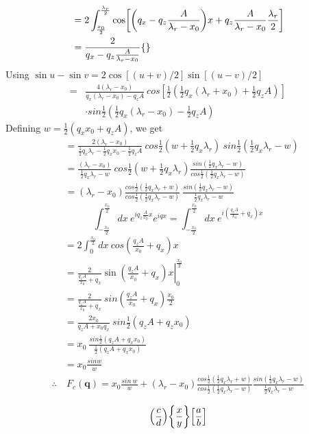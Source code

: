 \documentclass[letterpage]{article}
\begin{document}
\begin{align}
  &= 2\int_{\frac{x_0}{2}}^{\frac{\lambda_r}{2}}   
     \cos\mathopen{}\left[ \mathopen{}\left( q_x-q_z\frac{A}{\lambda_r-x_0} \right)\mathclose{}x
     + q_z\frac{A}{\lambda_r-x_0}\frac{\lambda_r}{2} \right]\mathclose{} \\
  &= \frac{2}{q_x-q_z\frac{A}{\lambda_r-x_0}} 
     \mathopen{}\left\lbrace  \right\rbrace\mathclose{}
\end{align}
Using $\sin u-\sin v = 2\cos[(u+v)/2]\sin[(u-v)/2]$
\begin{align}
  =& \frac{4(\lambda_r-x_0)}{q_x(\lambda_r-x_0)-q_zA}
  \: cos\left[\frac{1}{2} \left(\frac{1}{2}q_x (\lambda_r + x_0)
  + \frac{1}{2} q_zA \right)\right]\\
  & \cdot sin \frac{1}{2} \left(\frac{1}{2}q_x(\lambda_r-x_0)
  -\frac{1}{2}q_zA\right)
\end{align}
Defining $w = \frac{1}{2} \left(q_xx_0 + q_z A \right)$, we get
\begin{align}
  &= \frac{2(\lambda_r-x_0)}{\frac{1}{2}q_x \lambda_r - \frac{1}{2}q_x x_0
  -\frac{1}{2} q_z A} \: cos \frac{1}{2} \left(w + \frac{1}{2}q_x 
  \lambda_r \right) \: sin \frac{1}{2} \left(\frac{1}{2} q_x \lambda_r-w \right)\\
  &= \frac{(\lambda_r-x_0)}{\frac{1}{2}q_x \lambda_r - w} \: cos \frac{1}{2}
  \left(w + \frac{1}{2}q_x \lambda_r \right) 
  \frac{sin\left(\frac{1}{2}q_x \lambda_r - w \right)}
  {cos\frac{1}{2}\left(\frac{1}{2}q_x \lambda_r -w \right)}\\
  &= (\lambda_r - x_0) \frac{cos\frac{1}{2}\left(\frac{1}{2}q_x \lambda_r
  + w \right)}{cos\frac{1}{2} \left(\frac{1}{2} q_x \lambda_r - w \right)}
  \: \frac{sin \left(\frac{1}{2}q_x \lambda_r - w \right)}{\frac{1}{2}
  q_x \lambda_r - w}
\end{align}
\begin{equation}
  \int_{-\frac{x_0}{2}}^{\frac{x_0}{2}} dx \: e^{iq_z \frac{A}{x_0}x}
  e^{iqx} = \int_{-\frac{x_0}{2}}^{\frac{x_0}{2}} dx \: 
  e^{i\left(\frac{q_zA}{x_0} + q_x \right)x}
\end{equation}
\begin{align}
  &= 2 \int_{0}^{\frac{x_0}{2}} dx \:cos \left(\frac{q_zA}{x_0} + q_x \right)x\\
  &= \frac{2}{\frac{q_zA}{x_0} + q_x}
    \sin\left.\left(\frac{q_zA}{x_0} + q_x \right) x \right|_{0}^{\frac{x_0}{2}}\\
  &= \frac{2}{\frac{q_zA}{x_0}+q_x} \: sin \left(\frac{q_zA}{x_0}+q_x \right)
  \frac{x_0}{2}\\
  &= \frac{2x_0}{q_zA + x_0 q_x} \: sin \frac{1}{2} (q_zA + q_z x_0)\\
  &= x_0 \: \frac{sin\frac{1}{2}\left(q_zA + q_x x_0 \right)}
  {\frac{1}{2}\left(q_zA + q_x x_0 \right)}\\
  &= x_0 \frac{sinw}{w}\\
  \therefore & \: F_c(\textbf{q}) = x_0 \frac{sin \:w}{w} + (\lambda_r - x_0)
  \frac{cos\frac{1}{2}\left(\frac{1}{2} q_x \lambda_r + w\right)}
  {cos\frac{1}{2} \left(\frac{1}{2}q_x \lambda_r - w \right)}
  \frac{sin\left(\frac{1}{2}q_x \lambda_r - w \right)}{\frac{1}{2}q_x \lambda_r
  - w}
\end{align}

\begin{equation}
  \mathopen{}\left( \frac{c}{d} \right)\mathclose{}
  \mathopen{}\left\lbrace \frac{x}{y} \right\rbrace\mathclose{}
  \mathopen{}\left[ \frac{a}{b} \right]\mathclose{}
\end{equation}
\end{document}
